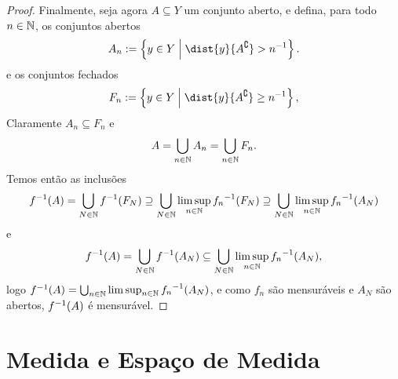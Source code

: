 \begin{proof}
Finalmente, seja agora $A \subseteq Y$ um conjunto aberto, e defina, para todo $n \in \mathbb{N}$, os conjuntos abertos
	\begin{equation*}
	A_n := \set{y \in Y}{\dist{y}{A^\complement} > n\inv}.
	\end{equation*}
e os conjuntos fechados
	\begin{equation*}
	F_n := \set{y \in Y}{\dist{y}{A^\complement} \geq n\inv},
	\end{equation*}
Claramente $A_n \subseteq F_n$ e
	\begin{equation*}
	A = \bigcup_{n \in \mathbb{N}} A_n = \bigcup_{n \in \mathbb{N}} F_n.
	\end{equation*}
Temos então as inclusões
	\begin{equation*}
	f^{-1}(A) = \bigcup_{N \in \mathbb{N}} f^{-1}(F_N) \supseteq \bigcup_{N \in \mathbb{N}}\limsup_{n \in \mathbb{N}} {f_n}^{-1}(F_N) \supseteq \bigcup_{N \in \mathbb{N}} \limsup_{n \in \mathbb{N}} {f_n}^{-1}(A_N)
	\end{equation*}
e
	\begin{equation*}
	f^{-1}(A) = \bigcup_{N \in \mathbb{N}} f^{-1}(A_N) \subseteq \bigcup_{N \in \mathbb{N}} \limsup_{n \in \mathbb{N}} {f_n}^{-1}(A_N),
	\end{equation*}
logo $f^{-1}(A) = \bigcup_{n \in \mathbb{N}} \limsup_{n \in \mathbb{N}} {f_n}^{-1}(A_N)$, e como $f_n$ são mensuráveis e $A_N$ são abertos, $f^{-1}(A)$ é mensurável.
\end{proof}

















\section{Medida e Espaço de Medida}

